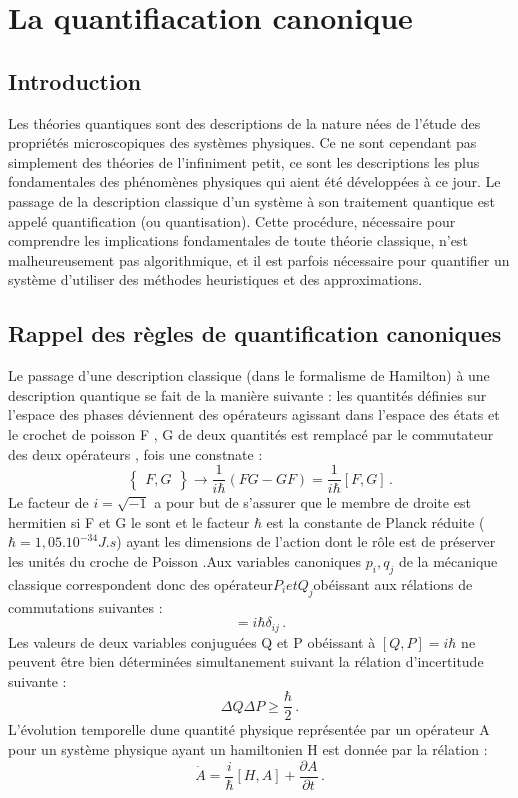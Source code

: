 \documentclass[12pt,a4paper, openany]{article}
\begin{document}
	
\newpage	
\section{La quantifiacation canonique} 
\subsection{Introduction} 


Les théories quantiques sont des descriptions de la nature nées de l’étude des propriétés microscopiques des systèmes physiques. Ce ne sont cependant pas simplement des théories de l’inﬁniment petit, ce sont les descriptions les plus fondamentales des phénomènes physiques qui aient été développées à ce jour. Le passage de la description classique d’un système à son traitement quantique est appelé quantiﬁcation (ou quantisation). Cette procédure, nécessaire pour comprendre les implications fondamentales de toute théorie classique, n’est malheureusement pas algorithmique, et il est parfois nécessaire pour quantiﬁer un système d’utiliser des méthodes heuristiques et des approximations. \\
\subsection{Rappel des règles de quantification canoniques}
Le passage d’une description classique (dans le formalisme de Hamilton) à une description quantique se fait de la manière suivante : les quantités définies sur l'espace des phases déviennent des opérateurs agissant dans l'espace des états et le crochet de poisson {F , G} de deux quantités est remplacé par le commutateur des deux opérateurs , fois une constnate :
\begin{equation}
\left\{\begin{aligned}
	F , G
\end{aligned}\right\} \rightarrow{\frac{1}{i{\hbar}}(FG-GF)}=\frac{1}{i{\hbar}}[F , G]\, .  
\end{equation}
Le facteur de $i=\sqrt{-1}$ a pour but de s’assurer que le membre de droite est hermitien si F et G le sont et le facteur $\hbar$ est la constante de Planck réduite ($\hbar=1,05.10^{-34} J.s$) ayant les dimensions de l'action dont le r\^{o}le est de préserver les unités du croche de Poisson .Aux variables canoniques $p_i , q_j$ de la mécanique classique correspondent donc des opérateur$ P_i et Q_j $obéissant aux rélations de commutations suivantes :
\begin{equation}
	[Q_i ,P_j]=i{\hbar}{\delta}_{ij} \,.
\end{equation} 
Les valeurs de deux variables conjuguées Q et P obéissant à $[Q,P]=i{\hbar}$ ne peuvent \^{e}tre  bien déterminées simultanement suivant  la rélation d'incertitude suivante : 
\begin{equation}
	\Delta{Q}\Delta{P}\geq\frac{\hbar}{2} \,.
\end{equation}
L'évolution temporelle dune quantité physique représentée par un opérateur A  pour un système physique ayant un hamiltonien H est donnée par la rélation :
\begin{equation}
	\dot{A}=\frac{i}{\hbar}[H,A]+\frac{\partial{A}}{\partial{t}} \,.
\end{equation}
\end{document}
